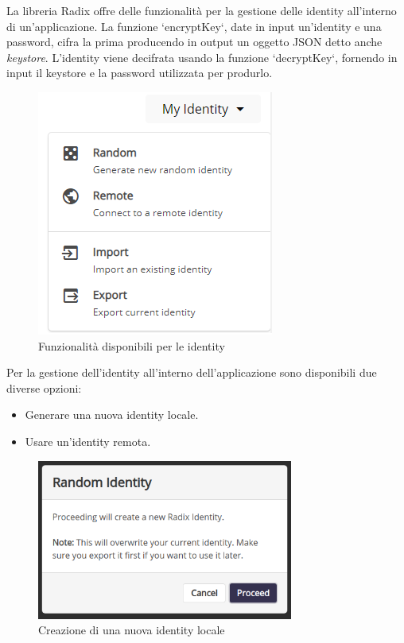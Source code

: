 La libreria Radix offre delle funzionalità per la gestione delle identity all'interno di un'applicazione. La funzione `encryptKey`, date in input un'identity e una password, cifra la prima producendo in output un oggetto JSON detto anche \textit{keystore}. L'identity viene decifrata usando la funzione `decryptKey`, fornendo in input il keystore e la password utilizzata per produrlo.

\begin{figure}[H]
    \centering
    \includegraphics{images/application/identity-manage.png}
    \caption{Funzionalità disponibili per le identity}
    \label{fig:identity_manage}
\end{figure}

Per la gestione dell'identity all'interno dell'applicazione sono disponibili due diverse opzioni:
\begin{itemize}
    \item Generare una nuova identity locale.
    \item Usare un'identity remota.
\end{itemize}

\begin{figure}[H]
  \centering
  \includegraphics[width=0.75\textwidth]{images/application/create_random.png}
  \caption{Creazione di una nuova identity locale}
  \label{fig:identity_creation}
\end{figure}

